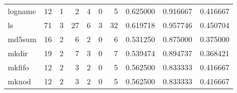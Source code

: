 \begin{tabular}{lrrrrrrrrr}
logname   &                                      12 &                                                  1 &                                                  2 &                                                  4 &                                                  0 &                                                  5 &                                           0.625000 &                               0.916667 &                             0.416667 \\
ls        &                                      71 &                                                  3 &                                                 27 &                                                  6 &                                                  3 &                                                 32 &                                           0.619718 &                               0.957746 &                             0.450704 \\
md5sum    &                                      16 &                                                  2 &                                                  6 &                                                  2 &                                                  0 &                                                  6 &                                           0.531250 &                               0.875000 &                             0.375000 \\
mkdir     &                                      19 &                                                  2 &                                                  7 &                                                  3 &                                                  0 &                                                  7 &                                           0.539474 &                               0.894737 &                             0.368421 \\
mkfifo    &                                      12 &                                                  2 &                                                  3 &                                                  2 &                                                  0 &                                                  5 &                                           0.562500 &                               0.833333 &                             0.416667 \\
mknod     &                                      12 &                                                  2 &                                                  3 &                                                  2 &                                                  0 &                                                  5 &                                           0.562500 &                               0.833333 &                             0.416667 \\

\end{tabular}
